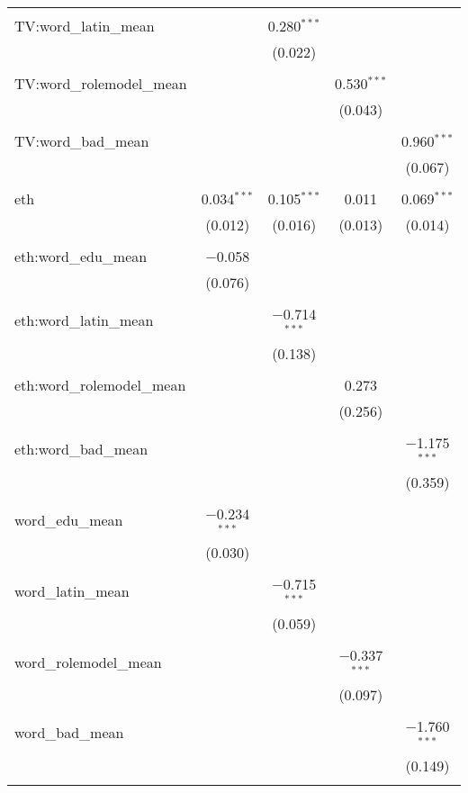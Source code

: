 \begin{table}[!htbp]
\begin{tabular}{@{\extracolsep{-2pt}}lcccc}
  & & & & \\ 
 TV:word\_latin\_mean &  & 0.280$^{***}$ &  &  \\ 
  &  & (0.022) &  &  \\ 
  & & & & \\ 
 TV:word\_rolemodel\_mean &  &  & 0.530$^{***}$ &  \\ 
  &  &  & (0.043) &  \\ 
  & & & & \\ 
 TV:word\_bad\_mean &  &  &  & 0.960$^{***}$ \\ 
  &  &  &  & (0.067) \\ 
  & & & & \\ 
 eth & 0.034$^{***}$ & 0.105$^{***}$ & 0.011 & 0.069$^{***}$ \\ 
  & (0.012) & (0.016) & (0.013) & (0.014) \\ 
  & & & & \\ 
 eth:word\_edu\_mean & $-$0.058 &  &  &  \\ 
  & (0.076) &  &  &  \\ 
  & & & & \\ 
 eth:word\_latin\_mean &  & $-$0.714$^{***}$ &  &  \\ 
  &  & (0.138) &  &  \\ 
  & & & & \\ 
 eth:word\_rolemodel\_mean &  &  & 0.273 &  \\ 
  &  &  & (0.256) &  \\ 
  & & & & \\ 
 eth:word\_bad\_mean &  &  &  & $-$1.175$^{***}$ \\ 
  &  &  &  & (0.359) \\ 
  & & & & \\ 
 word\_edu\_mean & $-$0.234$^{***}$ &  &  &  \\ 
  & (0.030) &  &  &  \\ 
  & & & & \\ 
 word\_latin\_mean &  & $-$0.715$^{***}$ &  &  \\ 
  &  & (0.059) &  &  \\ 
  & & & & \\ 
 word\_rolemodel\_mean &  &  & $-$0.337$^{***}$ &  \\ 
  &  &  & (0.097) &  \\ 
  & & & & \\ 
 word\_bad\_mean &  &  &  & $-$1.760$^{***}$ \\ 
  &  &  &  & (0.149) \\ 
  & & & & \\ 

\end{tabular}
\end{table}
